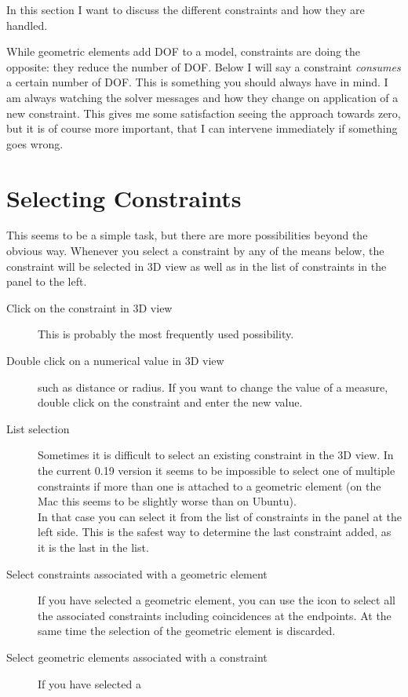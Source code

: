 \documentclass[12pt,titlepage]{article}
\newcommand{\icon}[1]{\raisebox{-1em}{\rule{0pt}{27pt}\texttt{[image: images/\#1]}}}
\begin{document}
\begin {itemize}
In this section I want to discuss the different constraints and how they are handled.

While geometric elements add DOF to a model, constraints are doing the opposite: they
reduce the number of DOF. Below I will say a constraint \emph{consumes} a
certain number of DOF. This is something you should always have in mind. I am
always watching the solver messages and how they change on application of a new
constraint. This gives me some satisfaction seeing the approach towards zero, but
it is of course more important, that I can intervene immediately if something goes wrong.

\section{Selecting Constraints}
This seems to be a simple task, but there are more possibilities beyond the obvious
way. Whenever you select a constraint by any of the means below, the constraint will
be selected in 3D view as well as in the list of constraints in the panel to the
left.
\begin{description}
\item [Click on the constraint in 3D view] This is probably the most frequently used
      possibility.
\item [Double click on a numerical value in 3D view] such as distance or radius. If you
      want to change the value of a measure, double click on the constraint
      and enter the new value.
\item [List selection] Sometimes it is difficult to select an existing
      constraint in the 3D view. In the current 0.19 version it
      seems to be impossible to select one of multiple constraints if more
      than one is attached to a geometric element (on the Mac this seems to be
      slightly worse than on Ubuntu).\\
      In that case you can select it from the list of constraints in the panel at the
      left side. This is the safest way to determine the last constraint added, as it
      is the last in the list.
\item [Select constraints associated with a geometric element] If you have selected a
      geometric element, you can use the icon \icon{Sketcher_SelectConstraints} to
      select all the associated constraints including coincidences at the endpoints.
      At the same time the selection of the geometric element is discarded.
\item [Select geometric elements associated with a constraint] If you have selected a

\end{description}
\end{itemize}
\end{document}

